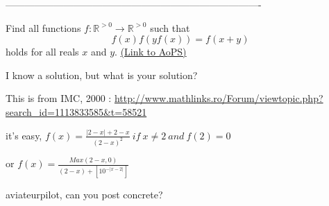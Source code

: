 -------------------------------------------------------------------------------

\begin{problem}
	Find all functions $f: \mathbb R^{>0} \to  \mathbb R^{>0} $ such that
\[f(x)f(yf(x))=f(x+y)\]
holds for all reals $x$ and $y$.
	\flushright \href{https://artofproblemsolving.com/community/c6h17444}{(Link to AoPS)}
\end{problem}



\begin{mysolution}
	I know a solution, but what is your solution?  
\end{mysolution}



\begin{mysolution}
	This is from IMC, 2000 : \url{http://www.mathlinks.ro/Forum/viewtopic.php?search_id=1113833585&t=58521}
\end{mysolution}



\begin{mysolution}
	it's easy,
$ f(x)=\frac{|2-x|+2-x}{(2-x)^{2}}\ if\ x\neq 2\ and\ f(2)=0$


or $ f(x)=\frac{Max(2-x,0)}{(2-x)+[10^{-|x-2|}]}$  
\end{mysolution}



\begin{mysolution}
	aviateurpilot, can you post concrete?
\end{mysolution}



